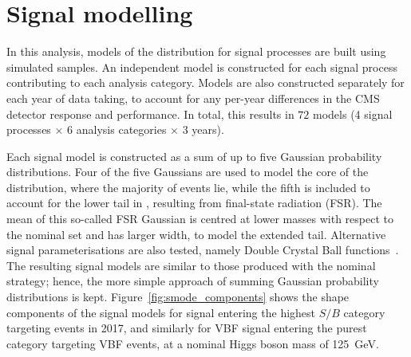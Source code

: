 \section{Signal modelling}
\label{sec:hee_s_modelling}

In this analysis, models of the \mee distribution for \Hee signal processes are built using simulated samples. An independent model is constructed for each signal process contributing to each analysis category. Models are also constructed separately for each year of data taking, to account for any per-year differences in the CMS detector response and performance. In total, this results in $72$ models (4 signal processes $\times$ 6 analysis categories $\times$ 3 years). 

Each signal model is constructed as a sum of up to five Gaussian probability distributions. Four of the five Gaussians are used to model the core of the \mee distribution, where the majority of events lie, while the fifth is included to account for the lower tail in \mee, resulting from final-state radiation (FSR). The mean of this so-called FSR Gaussian is centred at lower masses with respect to the nominal set and has larger width, to model the extended tail. Alternative signal parameterisations are also tested, namely Double Crystal Ball functions~\cite{DCB}. The resulting signal models are similar to those produced with the nominal strategy; hence, the more simple approach of summing Gaussian probability distributions is kept. Figure~\ref{fig:smode_components} shows the shape components of the signal models for \ggH signal entering the highest $S/B$ category targeting \ggH events in 2017, and similarly for VBF signal entering the purest category targeting VBF events, at a nominal Higgs boson mass of 125~GeV. 


